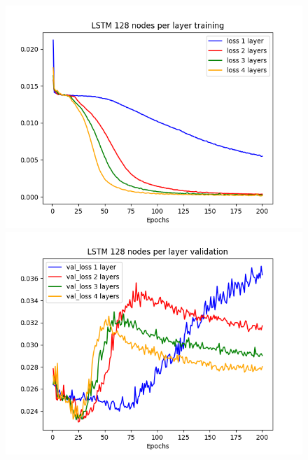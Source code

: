 \documentclass[11pt]
{article}
\begin{document}
\begin{figure}[H]
	\begin{minipage}[b]{0.33\linewidth}
		\centering
		\includegraphics[width=\linewidth]{../TESTS_RESULTS/LSTM_tests/plots/128_training.png} 
	\end{minipage}%
	\begin{minipage}[b]{0.33\linewidth}
		\centering
		\includegraphics[width=\linewidth]{../TESTS_RESULTS/LSTM_tests/plots/128_validation.png} 
	\end{minipage} 
\hspace*{-2cm}  
	\begin{minipage}[b]{0.33\linewidth}
		\centering

\end{minipage}
\end{figure}
\end{document}
